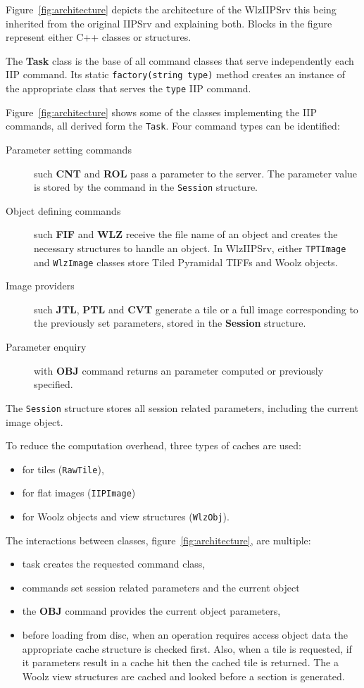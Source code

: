 \documentclass[11pt]{article}
\newcommand{\com}[1]{\textbf{#1}}
\begin{document}
Figure~\ref{fig:architecture} depicts the architecture of the WlzIIPSrv this
being inherited from the original IIPSrv and explaining both. Blocks in the
figure represent either C++ classes or structures.

The \com{Task} class is the base of all command classes that serve
independently each IIP command. Its static \texttt{factory(string type)}
method creates an instance of the appropriate class that serves the
\texttt{type} IIP command.

Figure~\ref{fig:architecture} shows some of the classes implementing the IIP
commands, all derived form the \texttt{Task}.
Four command types can be identified:
\begin{description}
\item[Parameter setting commands] such \com{CNT} and \com{ROL} pass a
parameter to the server. The parameter value is stored by the command in
the \texttt{Session} structure.
\item[Object defining commands] such \com{FIF} and \com{WLZ} receive the
file name of an object and creates the necessary structures to handle an
object.
In WlzIIPSrv, either \texttt{TPTImage} and \texttt{WlzImage} classes store
Tiled Pyramidal TIFFs and Woolz objects.
\item[Image providers] such \com{JTL}, \com{PTL} and \com{CVT} generate a
tile or a full image corresponding to the previously set parameters, stored
in the \com{Session} structure.
\item[Parameter enquiry] with \com{OBJ} command returns an parameter computed
or previously specified.
\end{description}

The \texttt{Session} structure stores all session related parameters,
including the current image object.

To reduce the computation overhead, three types of caches are used:
\begin{itemize}
\item for tiles (\texttt{RawTile}),
\item for flat images (\texttt{IIPImage})
\item for Woolz objects and view structures (\texttt{WlzObj}).
\end{itemize}

The interactions between classes, figure~\ref{fig:architecture}, are
multiple:
\begin{itemize}
\item task creates the requested command class,
\item commands set session related parameters and the current object
\item the \com{OBJ} command provides the current object parameters,
\item before loading from disc, when an operation requires access object data
      the appropriate cache structure is checked first.
      Also, when a tile is requested, if it parameters result in a cache hit
      then the cached tile is returned.
      The a Woolz view structures are cached and looked before a section is
      generated.
\end{itemize}
\end{document}
